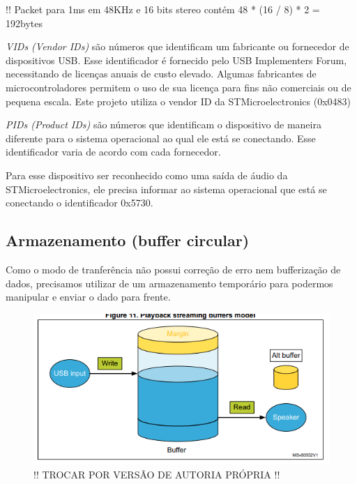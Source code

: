 
!! Packet para 1ms em 48KHz e 16 bits stereo contém 48 * (16 / 8) * 2 = 192bytes


\textit{VIDs (Vendor IDs)} são números que identificam um fabricante ou fornecedor de dispositivos USB. Esse identificador é fornecido pelo USB Implementers Forum, necessitando de licenças anuais de custo elevado. Algumas fabricantes de microcontroladores permitem o uso de sua licença para fins não comerciais ou de pequena escala. Este projeto utiliza o vendor ID da STMicroelectronics (0x0483)

\textit{PIDs (Product IDs)} são números que identificam o dispositivo de maneira diferente para o sistema operacional ao qual ele está se conectando. Esse identificador varia de acordo com cada fornecedor.

Para esse dispositivo ser reconhecido como uma saída de áudio da STMicroelectronics, ele precisa informar ao sistema operacional que está se conectando o identificador 0x5730.

\subsection{Armazenamento (buffer circular)}
Como o modo de tranferência não possui correção de erro nem bufferização de dados, precisamos utilizar de um armazenamento temporário para podermos manipular e enviar o dado para frente.
\begin{figure}[!h]
  \includegraphics[scale=0.5]{figuras/circular-buffer.png}
  \caption{!! TROCAR POR VERSÃO DE AUTORIA PRÓPRIA !!}
  \label{fig:circularBuffer}
\end{figure}

